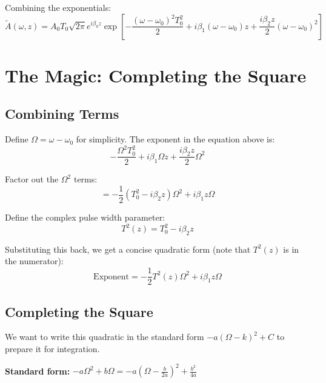 \documentclass[12pt]{article}
\begin{document}
Combining the exponentials:
\begin{equation}
\tilde{A}(\omega, z) = A_0 T_0 \sqrt{2\pi} e^{i\beta_0 z} \exp\left[-\frac{(\omega-\omega_0)^2 T_0^2}{2} + i\beta_1(\omega-\omega_0)z + \frac{i\beta_2 z}{2}(\omega-\omega_0)^2\right]
\end{equation}


\section{The Magic: Completing the Square}

\subsection{Combining Terms}

Define $\Omega = \omega - \omega_0$ for simplicity.
The exponent in the equation above is:
\begin{equation}
-\frac{\Omega^2 T_0^2}{2} + i\beta_1 \Omega z + \frac{i\beta_2 z}{2}\Omega^2
\end{equation}

Factor out the $\Omega^2$ terms:
\begin{equation}
= -\frac{1}{2}\left(T_0^2 - i\beta_2 z\right)\Omega^2 + i\beta_1 z \Omega
\end{equation}

Define the complex pulse width parameter:
\begin{equation}
T^2(z) = T_0^2 - i\beta_2 z
\end{equation}

Substituting this back, we get a concise quadratic form (note that $T^2(z)$ is in the numerator):
\begin{equation}
\boxed{\text{Exponent} = -\frac{1}{2}T^2(z)\Omega^2 + i\beta_1 z \Omega}
\end{equation}

\subsection{Completing the Square}

We want to write this quadratic in the standard form $-a(\Omega - k)^2 + C$ to prepare it for integration.

\textbf{Standard form:} $-a\Omega^2 + b\Omega = -a\left(\Omega - \frac{b}{2a}\right)^2 + \frac{b^2}{4a}$
\end{document}
